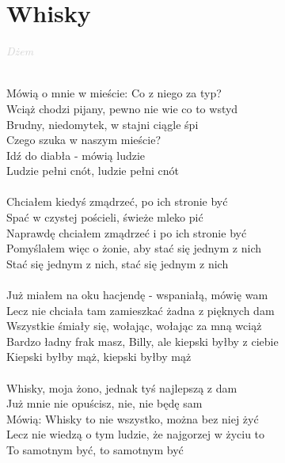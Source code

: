 \documentclass[a5paper, 10pt]{book}
\begin{document}
\newpage
\section{Whisky}\textcolor{lightgray}{\textit{Dżem}}\\~\\
\begin{minipage}[t]{0.8\textwidth}
  Mówią o mnie w mieście: Co z niego za typ?\\
  Wciąż chodzi pijany, pewno nie wie co to wstyd\\
  Brudny, niedomytek, w stajni ciągle śpi\\
  Czego szuka w naszym mieście?\\
  Idź do diabła - mówią ludzie\\
  Ludzie pełni cnót, ludzie pełni cnót\\
  \\
  Chciałem kiedyś zmądrzeć, po ich stronie być\\
  Spać w czystej pościeli, świeże mleko pić\\
  Naprawdę chciałem zmądrzeć i po ich stronie być\\
  Pomyślałem więc o żonie, aby stać się jednym z nich\\
  Stać się jednym z nich, stać się jednym z nich\\
  \\
  Już miałem na oku hacjendę - wspaniałą, mówię wam\\
  Lecz nie chciała tam zamieszkać żadna z pięknych dam\\
  Wszystkie śmiały się, wołając, wołając za mną wciąż\\
  Bardzo ładny frak masz, Billy, ale kiepski byłby z ciebie\\
  Kiepski byłby mąż, kiepski byłby mąż\\
  \\
  Whisky, moja żono, jednak tyś najlepszą z dam\\
  Już mnie nie opuścisz, nie, nie będę sam\\
  Mówią: Whisky to nie wszystko, można bez niej żyć\\
  Lecz nie wiedzą o tym ludzie, że najgorzej w życiu to\\
  To samotnym być, to samotnym być\\
\end{minipage}
\end{document}
